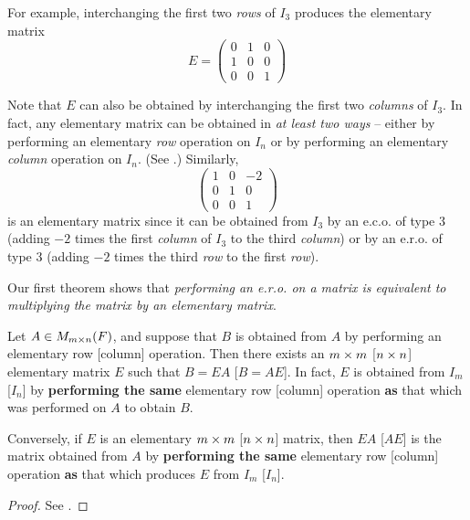 For example, interchanging the first two \emph{rows} of \(I_3\) produces the elementary matrix
\[
    E = \begin{pmatrix}
        0 & 1 & 0 \\
        1 & 0 & 0 \\
        0 & 0 & 1
    \end{pmatrix}
\]

\begin{remark} \label{remark 3.1.2}
Note that \(E\) can also be obtained by interchanging the first two \emph{columns} of \(I_3\).
In fact, any elementary matrix can be obtained in \emph{at least two ways} -- either by performing an elementary \emph{row} operation on \(I_n\) or by performing an elementary \emph{column} operation on \(I_n\).
(See .)
Similarly,
\[
    \begin{pmatrix}
        1 & 0 & -2 \\
        0 & 1 & 0 \\
        0 & 0 & 1
    \end{pmatrix}
\]
is an elementary matrix since it can be obtained from \(I_3\) by an e.c.o. of type 3
(adding \(-2\) times the first \emph{column} of \(I_3\) to the third \emph{column})
or by an e.r.o. of type 3 (adding \(-2\) times the third \emph{row} to the first \emph{row}).
\end{remark}

Our first theorem shows that \emph{performing an e.r.o. on a matrix is equivalent to multiplying the matrix by an elementary matrix}.

\begin{theorem} \label{thm 3.1}
Let \(A \in M_{m \times n}(F)\), and suppose that \(B\) is obtained from \(A\) by performing an elementary row [column] operation.
Then there exists an \(m \times m\) [\(n \times n\)] elementary matrix \(E\) such that \(B = EA\) [\(B = AE\)].
In fact, \(E\) is obtained from \(I_m\) [\(I_n\)] by \textbf{performing the same} elementary row [column] operation \textbf{as} that which was performed on \(A\) to obtain \(B\).

Conversely, if \(E\) is an elementary \(m \times m\) [\(n \times n\)] matrix, then \(EA\) [\(AE\)] is the matrix obtained from \(A\) by \textbf{performing the same} elementary row [column] operation \textbf{as} that which produces \(E\) from \(I_m\) [\(I_n\)].
\end{theorem}

\begin{proof}
See .
\end{proof}

